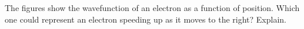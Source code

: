 The figures show the wavefunction of an electron as a function
of position. Which one could represent an
electron speeding up as it moves to
the right? Explain.
